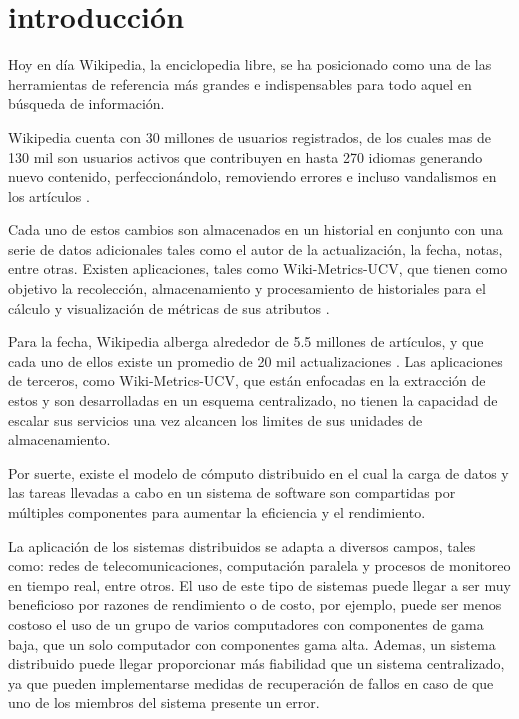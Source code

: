 \section*{introducción}

Hoy en día Wikipedia, la enciclopedia libre, se ha posicionado como una de las herramientas de
referencia más grandes e indispensables para todo aquel en búsqueda de información.

Wikipedia cuenta con 30 millones de usuarios registrados, de los cuales mas de 130 mil son
usuarios activos que contribuyen en hasta 270 idiomas generando nuevo contenido, perfeccionándolo,
removiendo errores e incluso vandalismos en los artículos \cite{1}.

Cada uno de estos cambios son almacenados en un historial en conjunto con una serie de datos
adicionales tales como el autor de la actualización, la fecha, notas, entre otras. Existen
aplicaciones, tales como Wiki-Metrics-UCV, que tienen como objetivo la recolección, almacenamiento
y procesamiento de historiales para el cálculo y visualización de métricas de sus atributos \cite{4}.

Para la fecha, Wikipedia alberga alrededor de 5.5 millones de artículos, y que cada uno de ellos existe un promedio de 20 mil actualizaciones \cite{2}. Las aplicaciones de terceros,
como Wiki-Metrics-UCV, que están enfocadas en la extracción de estos y son desarrolladas
en un esquema centralizado, no tienen la capacidad de escalar sus servicios una vez alcancen
los limites de sus unidades de almacenamiento.

Por suerte, existe el modelo de cómputo distribuido en el cual la carga de datos y las tareas llevadas a
cabo en un sistema de software son compartidas por múltiples componentes para aumentar la
eficiencia y el rendimiento.

La aplicación de los sistemas distribuidos se adapta a diversos campos, tales como:
redes de telecomunicaciones, computación paralela y procesos de monitoreo en tiempo
real, entre otros. El uso de este tipo de sistemas puede llegar a ser muy beneficioso por
razones de rendimiento o de costo, por ejemplo, puede ser menos costoso el uso de un grupo de varios
computadores con componentes de gama baja, que un solo computador con componentes gama alta. Ademas,
un sistema distribuido puede llegar proporcionar más fiabilidad que un sistema centralizado, ya
que pueden implementarse medidas de recuperación de fallos en caso de que uno de los miembros
del sistema presente un error.

